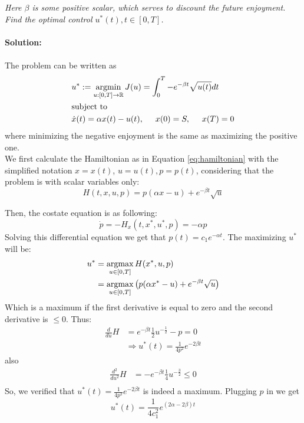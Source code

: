 \emph{Here $\beta$ is some positive scalar, which serves to discount the future enjoyment. Find the optimal control $u^* (t), t \in [0, T]$.}
\\
\\
\textbf{Solution:}\\
\\
The problem can be written as
\begin{align}
    &u^* := \operatorname*{argmin}_{u:[0,T] \to \mathbb{R}} J(u) = \int_0^T -e^{-\beta t} \sqrt{u(t)}dt \\
    &\text{subject to}\\
    &\Dot{x}(t) = \alpha x(t) - u(t), \hspace{0.5cm} x(0) = S, \hspace{0.5cm} x(T)=0
\end{align}
where minimizing the negative enjoyment is the same as maximizing the positive one.\\
We first calculate the Hamiltonian as in Equation \ref{eq:hamiltonian} with the simplified notation $x = x(t)$, $u = u(t), p = p(t)$, considering that the problem is with scalar variables only:
\\
\begin{equation}
    H(t, x, u, p) = p(\alpha x -u) + e^{-\beta t} \sqrt{u}
\end{equation}

Then, the costate equation is as following:
\begin{equation}
    \Dot{p} = -H_x(t, x^*, u^*, p) = -\alpha p
\end{equation}
Solving this differential equation we get that $p(t) = c_1 e^{-\alpha t}$. The maximizing $u^*$ will be:
\begin{align}
    u^* &= \operatorname*{argmax}_{u \in [0, T]} H(x^*, u, p)\\
    &= \operatorname*{argmax}_{u \in [0, T]} \left( p(\alpha x^* -u)  + e^{-\beta t} \sqrt{u} \right)
\end{align}
Which is a maximum if the first derivative is equal to zero and the second derivative is $\leq 0$. Thus:
\begin{align}
    \frac{d}{du} H &= e^{-\beta t} \frac{1}{2} u ^{- \frac{1}{2}} - p = 0\\
    & \Longrightarrow u^*(t) = \frac{1}{4p^2} e^{-2 \beta t} 
\end{align}
also
\begin{align}
    \frac{d^2}{du^2} H &= -e^{-\beta t} \frac{1}{4} u ^{- \frac{3}{2}} \leq 0\\
\end{align}
So, we verified that $u^*(t) = \frac{1}{4p^2} e^{-2 \beta t}$ is indeed a maximum. Plugging $p$ in we get
\begin{equation}
    u^*(t) = \frac{1}{4c_1^2}e^{(2 \alpha - 2 \beta) t}
\end{equation}

